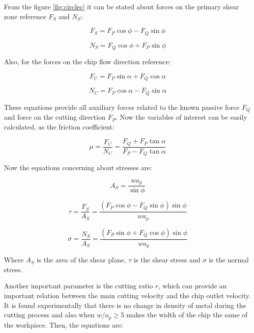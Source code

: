 	From the figure \ref{fig:circlec} it can be stated about forces on the primary shear zone reference $F_{S}$ and $N_{S}$:

	\begin{equation} 
	\label{}
	F_{S} = F_{P}\cos\phi - F_{Q}\sin\phi
	\end{equation}

	\begin{equation} 
	\label{}
	N_{S} = F_{Q}\cos\phi + F_{P}\sin\phi
	\end{equation}

	Also, for the forces on the chip flow direction reference:

	\begin{equation} 
	\label{}
	F_{C} = F_{P}\sin\alpha + F_{Q}\cos\alpha
	\end{equation}

	\begin{equation} 
	\label{}
	N_{C} = F_{P}\cos\alpha - F_{Q}\sin\alpha
	\end{equation}

	These equations provide all auxiliary forces related to the known passive force $F_{Q}$ and force on the cutting direction $F_{P}$. Now the variables of interest can be easily calculated, as the friction coefficient:

	\begin{equation} 
	\label{eq_friction}
	\mu = \frac{F_{C}}{N_{C}} = \frac{F_{Q} + F_{P}\tan\alpha}{F_{P} - F_{Q}\tan\alpha}
	\end{equation}

	Now the equations concerning about stresses are:

	\begin{equation} 
	\label{}
	A_{S} = \frac{wa_{p}}{\sin\phi}
	\end{equation}

	\begin{equation} 
	\label{}
	\tau = \frac{F_{S}}{A_{S}} = \frac{(F_{P}\cos\phi - F_{Q}\sin\phi)\sin\phi}{wa_{p}}
	\end{equation}

	\begin{equation} 
	\label{}
	\sigma = \frac{N_{S}}{A_{S}} = \frac{(F_{P}\sin\phi + F_{Q}\cos\phi)\sin\phi}{wa_{p}}
	\end{equation}

	Where $A_{S}$ is the area of the shear plane, $\tau$ is the shear stress and $\sigma$ is the normal stress.

	Another important parameter is the cutting ratio $r$, which can provide an important relation between the main cutting velocity and the chip outlet velocity. It is found experimentally that there is no change in density of metal during the cutting process and also when $w/a_{p} \geq 5$ makes the width of the chip the same of the workpiece. Then, the equations are:

